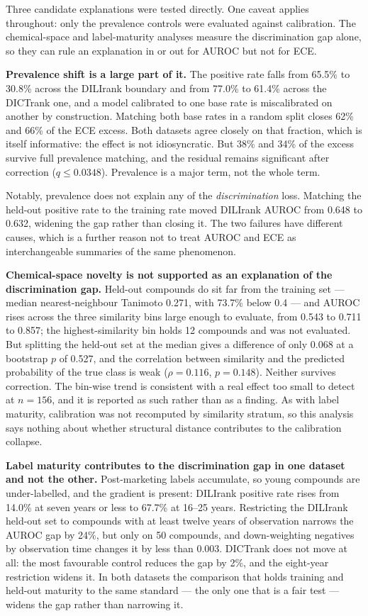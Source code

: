 Three candidate explanations were tested directly. One caveat applies throughout:
only the prevalence controls were evaluated against calibration. The chemical-space
and label-maturity analyses measure the discrimination gap alone, so they can rule
an explanation in or out for AUROC but not for ECE.

\textbf{Prevalence shift is a large part of it.} The positive rate falls from
65.5\% to 30.8\% across the DILIrank boundary and from 77.0\% to 61.4\% across the
DICTrank one, and a model calibrated to one base rate is miscalibrated on another
by construction. Matching both base rates in a random split closes 62\% and 66\%
of the ECE excess. Both datasets agree closely on that fraction, which is itself
informative: the effect is not idiosyncratic. But 38\% and 34\% of the excess survive
full prevalence matching, and the residual remains significant after
correction ($q \le 0.0348$). Prevalence is a major term, not the whole term.

Notably, prevalence does not explain any of the \emph{discrimination} loss. Matching
the held-out positive rate to the training rate moved DILIrank AUROC from 0.648 to
0.632, widening the gap rather than closing it. The two failures have different
causes, which is a further reason not to treat AUROC and ECE as interchangeable
summaries of the same phenomenon.

\textbf{Chemical-space novelty is not supported as an explanation of the
discrimination gap.} Held-out
compounds do sit far from the training set --- median nearest-neighbour Tanimoto
0.271, with 73.7\% below 0.4 --- and AUROC rises across the three similarity bins
large enough to evaluate, from 0.543 to 0.711 to 0.857; the highest-similarity bin
holds 12 compounds and was not evaluated. But splitting the held-out set at the
median gives a difference of only
0.068 at a bootstrap $p$ of 0.527, and the correlation between similarity and the
predicted probability of the true class is weak ($\rho = 0.116$, $p = 0.148$).
Neither survives correction. The bin-wise trend is consistent with a real effect
too small to detect at $n = 156$, and it is reported as such rather than as a
finding. As with label maturity, calibration was not recomputed by similarity
stratum, so this analysis says nothing about whether structural distance
contributes to the calibration collapse.

\textbf{Label maturity contributes to the discrimination gap in one dataset and not
the other.} Post-marketing labels accumulate, so young compounds are
under-labelled, and the gradient is present: DILIrank positive rate rises from
14.0\% at seven years or less to 67.7\% at 16--25 years. Restricting the DILIrank
held-out set to compounds with at least twelve years of observation narrows the
AUROC gap by 24\%, but only on 50 compounds, and down-weighting negatives by
observation time changes it by less than 0.003. DICTrank does not move at all: the
most favourable control reduces the gap by 2\%, and the eight-year restriction
widens it. In both datasets the comparison that holds training and held-out
maturity to the same standard --- the only one that is a fair test --- widens the
gap rather than narrowing it.

